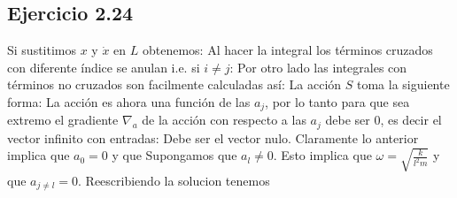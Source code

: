 \subsection*{Ejercicio 2.24}
Si sustitimos $x$ y $\dot x$ en $L$ obtenemos:
Al hacer la integral los t\'erminos cruzados con diferente \'indice se anulan i.e. si  $i\neq j$:
Por otro lado las integrales con t\'erminos no cruzados son facilmente calculadas as\'i:
La acci\'on $S$ toma la siguiente forma:
La acci\'on es ahora una funci\'on de las $a_j$, por lo tanto para que sea extremo el gradiente $\nabla_a$ de la acci\'on con respecto a las $a_j$ debe ser $0$, es decir el vector infinito con entradas:
Debe ser el vector nulo. Claramente lo anterior implica que $a_0=0$ y que 
Supongamos que $a_l \neq 0$. Esto implica que $\omega= \sqrt{\frac{k}{l^2 m}}$ y que $a_{j \neq l}=0$.
Reescribiendo la solucion tenemos 
